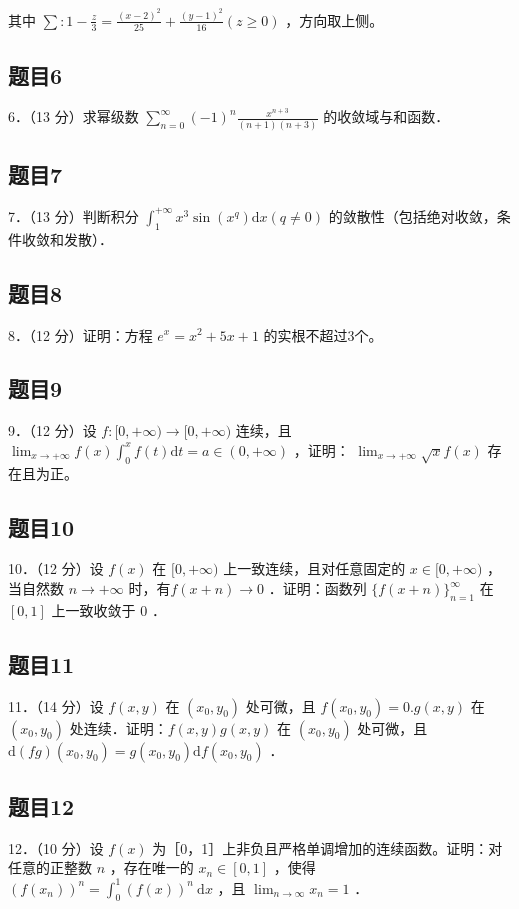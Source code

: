 \documentclass{article}
\begin{document}
其中 \(\sum: 1-\frac{z}{3}=\frac{(x-2)^{2}}{25}+\frac{(y-1)^{2}}{16}(z \geq 0)\) ，方向取上侧。

\subsection{题目6}
6．（13 分）求幂级数 \(\sum_{n=0}^{\infty}(-1)^{n} \frac{x^{n+3}}{(n+1)(n+3)}\) 的收敛域与和函数．

\subsection{题目7}
7．（13 分）判断积分 \(\int_{1}^{+\infty} x^{3} \sin \left(x^{q}\right) \mathrm{d} x(q \neq 0)\) 的敛散性（包括绝对收敛，条件收敛和发散）．

\subsection{题目8}
8．（12 分）证明：方程 \(e^{x}=x^{2}+5 x+1\) 的实根不超过3个。

\subsection{题目9}
9．（12 分）设 \(f:[0,+\infty) \rightarrow[0,+\infty)\) 连续，且 \(\lim _{x \rightarrow+\infty} f(x) \int_{0}^{x} f(t) \mathrm{d} t=a \in(0,+\infty)\) ，证明： \(\lim _{x \rightarrow+\infty} \sqrt{x} f(x)\) 存在且为正。

\subsection{题目10}
10．（12 分）设 \(f(x)\) 在 \([0,+\infty)\) 上一致连续，且对任意固定的 \(x \in[0,+\infty)\) ，当自然数 \(n \rightarrow+\infty\) 时，有\(f(x+n) \rightarrow 0\) ．证明：函数列 \(\{f(x+n)\}_{n=1}^{\infty}\) 在 \([0,1]\) 上一致收敛于 0 ．

\subsection{题目11}
11．（14 分）设 \(f(x, y)\) 在 \(\left(x_{0}, y_{0}\right)\) 处可微，且 \(f\left(x_{0}, y_{0}\right)=0 . g(x, y)\) 在 \(\left(x_{0}, y_{0}\right)\) 处连续．证明：\(f(x, y) g(x, y)\) 在 \(\left(x_{0}, y_{0}\right)\) 处可微，且 \(\mathrm{d}(f g)\left(x_{0}, y_{0}\right)=g\left(x_{0}, y_{0}\right) \mathrm{d} f\left(x_{0}, y_{0}\right)\) ．

\subsection{题目12}
12．（10 分）设 \(f(x)\) 为［0，1］上非负且严格单调增加的连续函数。证明：对任意的正整数 \(n\) ，存在唯一的 \(x_{n} \in[0,1]\) ，使得 \(\left(f\left(x_{n}\right)\right)^{n}=\int_{0}^{1}(f(x))^{n} \mathrm{~d} x\) ，且 \(\lim _{n \rightarrow \infty} x_{n}=1\) ．
\end{document}
